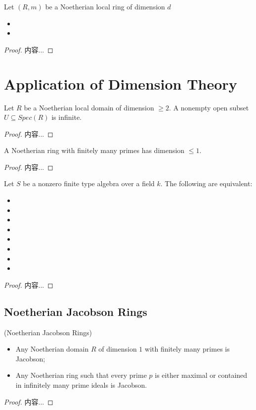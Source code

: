 \documentclass[Total.tex]{subfiles}
\begin{document}
				\begin{lemma}
					Let $(R,m)$ be a Noetherian local ring of dimension $d$
					\begin{itemize}
						\item 
						\item 
					\end{itemize}
				\end{lemma}
				\begin{proof}
					内容...
				\end{proof}
		\section{Application of Dimension Theory}
			\begin{lemma}
				Let $R$ be a Noetherian local domain of dimension $\geq 2$. A nonempty open subset $U\subseteq Spec(R)$ is infinite.
			\end{lemma}
			\begin{proof}
				内容...
			\end{proof}
			
			\begin{lemma}
				A Noetherian ring with finitely many primes has dimension $\leq 1$.
			\end{lemma}
			\begin{proof}
				内容...
			\end{proof}
			
			\begin{lemma}
				Let $S$ be a nonzero finite type algebra over a field $k$. The following are equivalent:
				\begin{itemize}
					\item 
					\item 
					\item 
					\item 
					\item 
					\item 
					\item 
					\item 
				\end{itemize}
			\end{lemma}
			\begin{proof}
				内容...
			\end{proof}
			\subsection{Noetherian Jacobson Rings}
				
				\begin{lemma}
					(Noetherian Jacobson Rings)
					\begin{itemize}
						\item Any Noetherian domain $R$ of dimension $1$ with finitely many primes is Jacobson;
						\item Any Noetherian ring such that every prime $p$ is either maximal or contained in infinitely many prime ideals is Jacobson.
					\end{itemize}
				\end{lemma}
				\begin{proof}
					内容...
				\end{proof}
		
\end{document}
